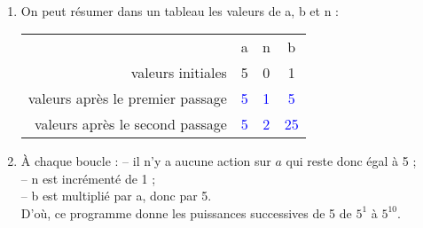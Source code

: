 \ \\ [-5mm]
   \begin{enumerate}
      \item On peut résumer dans un tableau les valeurs de a, b et n : \\  [1mm]
      \qquad
      {
         \begin{tabular}{r|C{0.8}|C{0.8}|C{0.8}|}
            & a & n & b \\
            valeurs initiales & 5 & 0 & 1 \\
            valeurs après le premier passage & \textcolor{blue}{5} & \textcolor{blue}{1} & \textcolor{blue}{5} \\
            valeurs après le second passage & \textcolor{blue}{5} & \textcolor{blue}{2} & \textcolor{blue}{25} \\
         \end{tabular}
      } \medskip
   \item À chaque boucle :
       -- il n'y a aucune action sur $a$ qui reste donc égal à 5 ; \\
       -- n est incrémenté de 1 ; \\
       -- b est multiplié par a, donc par 5. \\
       D'où, {\blue ce programme donne les puissances successives de 5 de $5^1$ à $5^{10}$.}
   \end{enumerate}
